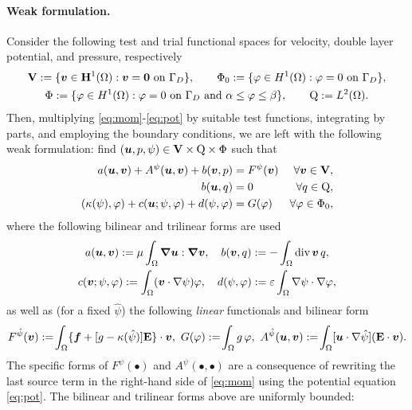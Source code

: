 \paragraph{Weak formulation.}
Consider 
the following  test and trial functional spaces for velocity, double layer potential, and pressure, respectively %
\begin{gather*}
\bV: = \{ \bv \in \bH^1(\Omega): \bv = \cero \ \text{on} \ \Gamma_D\},\qquad \Phi_0 := \{\varphi \in H^1(\Omega): \varphi = 0 \ \text{on} \ \Gamma_D\},\\ \Phi := \{\varphi \in H^1(\Omega): \varphi = 0 \ \text{on} \ \Gamma_D  \ \text{and} \ \alpha \leq \varphi \leq \beta\}, \qquad  \rQ:= L^2(\Omega).
 \end{gather*}
Then, multiplying \eqref{eq:mom}-\eqref{eq:pot} by suitable test functions, integrating by parts, and employing the boundary conditions, we are left with the following weak formulation: find $(\boldsymbol{u}, p, \psi) \in \mathbf{V} \times \mathrm{Q} \times \Phi$ such that 
\begin{subequations}\label{eq:weak}
\begin{align}
a(\boldsymbol{u}, \boldsymbol{v}) + A^{\psi}(\boldsymbol{u},\boldsymbol{v}) + b(\boldsymbol{v},p) & = F^\psi(\boldsymbol{v}) & \forall \boldsymbol{v} \in \mathbf{V},\\
b(\boldsymbol{u}, q) & = 0 & \forall q \in \mathrm{Q},\\
(\kappa(\psi),\varphi) + c(\boldsymbol{u}; \psi, \varphi)+ d(\psi,\varphi) & = G(\varphi) & \forall \varphi \in \Phi_0,
\end{align}
\end{subequations}
where the following bilinear and trilinear forms are used 
\begin{gather*}
a(\boldsymbol{u},\boldsymbol{v}) := \mu \int_\Omega \boldsymbol{\nabla} \boldsymbol{u} : \boldsymbol{\nabla} \boldsymbol{v}, \quad b(\boldsymbol{v}, q):= - \int_\Omega \operatorname{div}\boldsymbol{v}\,q, \\ c(\boldsymbol{v}; \psi, \varphi): = \int_\Omega (\boldsymbol{v}\cdot \nabla \psi)\varphi, \quad 
d(\psi,\varphi) := \varepsilon\int_\Omega \nabla \psi\cdot\nabla\varphi,
\end{gather*}
as well as (for a fixed $\hat{\psi}$) the following \emph{linear} functionals and bilinear form 
\[ F^{\hat{\psi}}(\boldsymbol{v}):= \!\int_\Omega \{\boldsymbol{f} + [g - \kappa(\hat{\psi})]\mathbf{E}\}\cdot \boldsymbol{v}, \ G(\varphi):= \!\int_\Omega g\,\varphi, \ A^{\hat{\psi}}(\boldsymbol{u},\boldsymbol{v}):= \!\int_\Omega [\boldsymbol{u}\cdot\nabla\hat{\psi}](\mathbf{E}\cdot\boldsymbol{v}). \]
The specific forms of $F^\psi(\bullet)$ and $A^\psi(\bullet,\bullet)$ are a consequence of rewriting the last source term in the right-hand side of \eqref{eq:mom} using the potential equation \eqref{eq:pot}.  The bilinear and trilinear forms   above are uniformly bounded:
